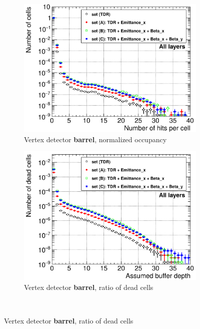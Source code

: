  \begin{figure}
 \centering
  \begin{subfigure}[b]{0.49\textwidth}
   \centering
    \includegraphics[width=\textwidth]{Figures/Pairs/Occupancy_Comparison_All_layers_wrt_cells_ILC250_Comparison_ALL_SETS_5T_w_antiDiD_LEG.png}
   \caption{Vertex detector \textbf{barrel}, normalized occupancy}
   \end{subfigure}
   \hfill
    \begin{subfigure}[b]{0.49\textwidth}
   \centering
    \includegraphics[width=\textwidth]{Figures/Pairs/Occupancy_Comparison_All_layers_deadcells_ILC250_Comparison_ALL_SETS_5T_w_antiDiD_LEG.png}
   \caption{Vertex detector \textbf{barrel}, ratio of dead cells}
   \end{subfigure}\\

\end{figure}
